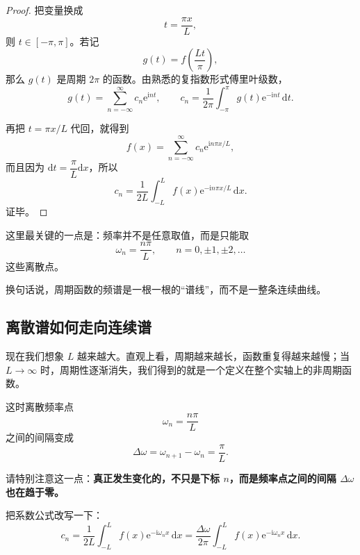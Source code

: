 \begin{proof}
把变量换成
\[
    t=\frac{\pi x}{L},
\]
则 $t \in [-\pi,\pi]$。若记
\[
    g(t)=f\left(\frac{Lt}{\pi}\right),
\]
那么 $g(t)$ 是周期 $2\pi$ 的函数。由熟悉的复指数形式傅里叶级数，
\begin{equation}
    g(t)=\sum_{n=-\infty}^{\infty} c_n \mathrm{e}^{\mathrm{i}nt},
    \qquad
    c_n=\frac{1}{2\pi}\int_{-\pi}^{\pi} g(t)\mathrm{e}^{-\mathrm{i}nt}\,\mathrm{d}t.
\end{equation}

再把 $t=\pi x/L$ 代回，就得到
\begin{equation}
    f(x)=\sum_{n=-\infty}^{\infty} c_n \mathrm{e}^{\mathrm{i}n\pi x/L},
\end{equation}
而且因为 $\mathrm{d}t=\dfrac{\pi}{L}\mathrm{d}x$，所以
\begin{equation}
    c_n=\frac{1}{2L}\int_{-L}^{L} f(x)\mathrm{e}^{-\mathrm{i}n\pi x/L}\,\mathrm{d}x.
\end{equation}
证毕。
\end{proof}

这里最关键的一点是：频率并不是任意取值，而是只能取
\begin{equation}
    \omega_n=\frac{n\pi}{L}, \qquad n=0,\pm 1,\pm 2,\ldots
\end{equation}
这些离散点。

换句话说，周期函数的频谱是一根一根的``谱线''，而不是一整条连续曲线。

\subsection{离散谱如何走向连续谱}

现在我们想象 $L$ 越来越大。直观上看，周期越来越长，函数重复得越来越慢；当 $L\to\infty$ 时，周期性逐渐消失，我们得到的就是一个定义在整个实轴上的非周期函数。

这时离散频率点
\begin{equation}
    \omega_n=\frac{n\pi}{L}
\end{equation}
之间的间隔变成
\begin{equation}
    \Delta\omega=\omega_{n+1}-\omega_n=\frac{\pi}{L}.
\end{equation}

请特别注意这一点：\textbf{真正发生变化的，不只是下标 $n$，而是频率点之间的间隔 $\Delta\omega$ 也在趋于零。}

把系数公式改写一下：
\begin{equation}
    c_n=\frac{1}{2L}\int_{-L}^{L} f(x)\mathrm{e}^{-\mathrm{i}\omega_n x}\,\mathrm{d}x
    =
    \frac{\Delta\omega}{2\pi}\int_{-L}^{L} f(x)\mathrm{e}^{-\mathrm{i}\omega_n x}\,\mathrm{d}x.
\end{equation}

